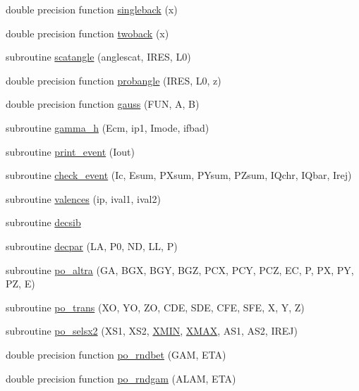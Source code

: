 \begin{DoxyCompactItemize}
\item 
double precision function \hyperlink{sophia_8f_a3e9c601e3b3287dd92907cd27246bcbd}{singleback} (x)
\item 
double precision function \hyperlink{sophia_8f_a4deb51d3df1be9320d285099ba47c9f2}{twoback} (x)
\item 
subroutine \hyperlink{sophia_8f_a418495cd6ce7360591246a1ee9b038c1}{scatangle} (anglescat, I\+R\+ES, L0)
\item 
double precision function \hyperlink{sophia_8f_a159ac1bbac5e0c396a90500617a127f6}{probangle} (I\+R\+ES, L0, z)
\item 
double precision function \hyperlink{sophia_8f_ab8d754cb468247243ac67fb277bd3ba6}{gauss} (F\+UN, A, B)
\item 
subroutine \hyperlink{sophia_8f_a221b6a8bd8c7cc596f7e8dd65c606dac}{gamma\+\_\+h} (Ecm, ip1, Imode, ifbad)
\item 
subroutine \hyperlink{sophia_8f_a4dba7b185d8bae723bb5b14a71766036}{print\+\_\+event} (Iout)
\item 
subroutine \hyperlink{sophia_8f_aba3e49e88d500c8ca82839c874166cfb}{check\+\_\+event} (Ic, Esum, P\+Xsum, P\+Ysum, P\+Zsum, I\+Qchr, I\+Qbar, Irej)
\item 
subroutine \hyperlink{sophia_8f_a7fd31ea25664e20b0469471449b57915}{valences} (ip, ival1, ival2)
\item 
subroutine \hyperlink{sophia_8f_a0992e3777708845cc43933feef2f520a}{decsib}
\item 
subroutine \hyperlink{sophia_8f_a9e00005d1f5d0ef7dbe87b5fc90f5091}{decpar} (LA, P0, ND, LL, P)
\item 
subroutine \hyperlink{sophia_8f_a17bed582d215cdca12ce6acc9110151e}{po\+\_\+altra} (GA, B\+GX, B\+GY, B\+GZ, P\+CX, P\+CY, P\+CZ, EC, P, PX, PY, PZ, E)
\item 
subroutine \hyperlink{sophia_8f_a90b3d826e619542e912c7540e0122f44}{po\+\_\+trans} (XO, YO, ZO, C\+DE, S\+DE, C\+FE, S\+FE, X, Y, Z)
\item 
subroutine \hyperlink{sophia_8f_a83ddf78a90c35295d600702e51711056}{po\+\_\+selsx2} (X\+S1, X\+S2, \hyperlink{pdist_8cc_a6aee779504f876f9bed834f36b392da9}{X\+M\+IN}, \hyperlink{pdist_8cc_a0312cb6d6cbc719075d4e5380c387ab3}{X\+M\+AX}, A\+S1, A\+S2, I\+R\+EJ)
\item 
double precision function \hyperlink{sophia_8f_a9362b6e86899866a31cb99e284e6668c}{po\+\_\+rndbet} (G\+AM, E\+TA)
\item 
double precision function \hyperlink{sophia_8f_af30a5e7351ea97fc265bbf22a0e99b8e}{po\+\_\+rndgam} (A\+L\+AM, E\+TA)

\end{DoxyCompactItemize}
